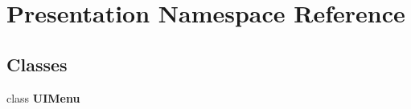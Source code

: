 \hypertarget{namespace_presentation}{}\section{Presentation Namespace Reference}
\label{namespace_presentation}
\subsection*{Classes}
\begin{DoxyCompactItemize}
\item 
class {\bfseries U\+I\+Menu}
\end{DoxyCompactItemize}
